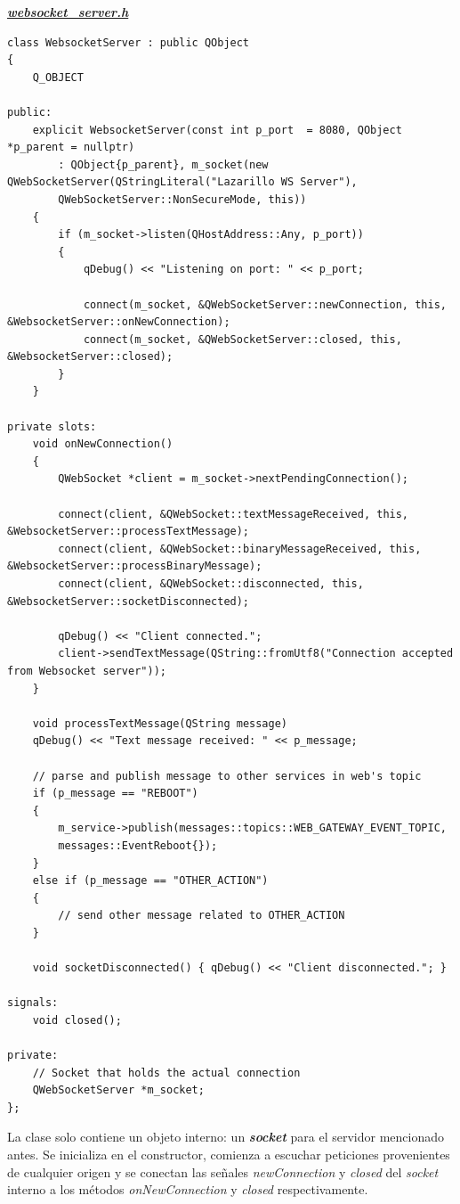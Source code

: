 \textbf{\textit{\href{https://github.com/adrianmorente/lazarillo-embedded/blob/master/web-gateway/inc/web-gateway.h}{websocket\_server.h}}}
\begin{lstlisting}
class WebsocketServer : public QObject
{
	Q_OBJECT
	
public:
	explicit WebsocketServer(const int p_port  = 8080, QObject *p_parent = nullptr)
		: QObject{p_parent}, m_socket(new QWebSocketServer(QStringLiteral("Lazarillo WS Server"),
		QWebSocketServer::NonSecureMode, this))
	{
		if (m_socket->listen(QHostAddress::Any, p_port))
		{
			qDebug() << "Listening on port: " << p_port;
			
			connect(m_socket, &QWebSocketServer::newConnection, this, &WebsocketServer::onNewConnection);
			connect(m_socket, &QWebSocketServer::closed, this, &WebsocketServer::closed);
		}
	}
	
private slots:
	void onNewConnection()
	{
		QWebSocket *client = m_socket->nextPendingConnection();
		
		connect(client, &QWebSocket::textMessageReceived, this, &WebsocketServer::processTextMessage);
		connect(client, &QWebSocket::binaryMessageReceived, this, &WebsocketServer::processBinaryMessage);
		connect(client, &QWebSocket::disconnected, this, &WebsocketServer::socketDisconnected);
		
		qDebug() << "Client connected.";
		client->sendTextMessage(QString::fromUtf8("Connection accepted from Websocket server"));
	}

	void processTextMessage(QString message)
	qDebug() << "Text message received: " << p_message;
	
	// parse and publish message to other services in web's topic
	if (p_message == "REBOOT")
	{
		m_service->publish(messages::topics::WEB_GATEWAY_EVENT_TOPIC,
		messages::EventReboot{});
	}
	else if (p_message == "OTHER_ACTION")
	{
		// send other message related to OTHER_ACTION
	}

	void socketDisconnected() { qDebug() << "Client disconnected."; }
	
signals:
	void closed();
	
private:
	// Socket that holds the actual connection
	QWebSocketServer *m_socket;
};
\end{lstlisting}

La clase solo contiene un objeto interno: un \textbf{\textit{socket}} para el servidor mencionado antes. Se inicializa en el constructor, comienza a escuchar peticiones provenientes de cualquier origen y se conectan las señales \emph{newConnection} y \emph{closed} del \textit{socket} interno a los métodos \emph{onNewConnection} y \emph{closed} respectivamente.\\

